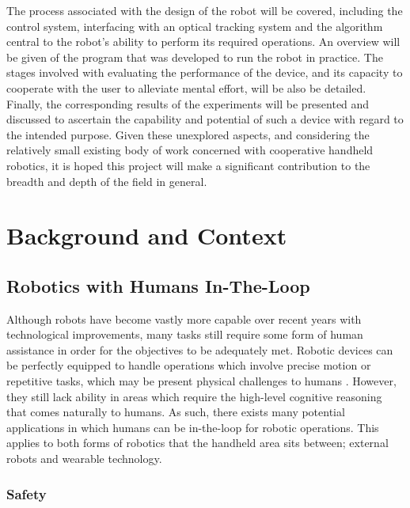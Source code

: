\documentclass[11pt]{article}
\begin{document}
The process associated with the design of the robot will be covered, including the control system, interfacing with an optical tracking system and the algorithm central to the robot's ability to perform its required operations. An overview will be given of the program that was developed to run the robot in practice. The stages involved with evaluating the performance of the device, and its capacity to cooperate with the user to alleviate mental effort, will be also be detailed. Finally, the corresponding results of the experiments will be presented and discussed to ascertain the capability and potential of such a device with regard to the intended purpose. Given these unexplored aspects, and considering the relatively small existing body of work concerned with cooperative handheld robotics, it is hoped this project will make a significant contribution to the breadth and depth of the field in general.

\pagebreak
\section{Background and Context}
\subsection{Robotics with Humans In-The-Loop} \label{intheloop}

Although robots have become vastly more capable over recent years with technological improvements, many tasks still require some form of human assistance in order for the objectives to be adequately met. Robotic devices can be perfectly equipped to handle operations which involve precise motion or repetitive tasks, which may be present physical challenges to humans \cite{Chipalkatty2012}. However, they still lack ability in areas which require the high-level cognitive reasoning that comes naturally to humans. As such, there exists many potential applications in which humans can be in-the-loop for robotic operations. This applies to both forms of robotics that the handheld area sits between; external robots and wearable technology.  

\subsubsection{Safety}
\end{document}
